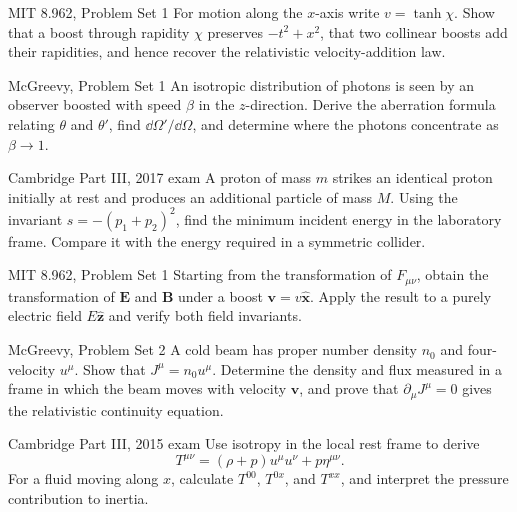 \begin{exercises}

\begin{exercise}{MIT 8.962, Problem Set 1}
For motion along the \(x\)-axis write \(v=\tanh\chi\).  Show that a boost through
rapidity \(\chi\) preserves \(-t^2+x^2\), that two collinear boosts add their
rapidities, and hence recover the relativistic velocity-addition law.
\end{exercise}

\begin{exercise}{McGreevy, Problem Set 1}
An isotropic distribution of photons is seen by an observer boosted with speed
\(\beta\) in the \(z\)-direction.  Derive the aberration formula relating
\(\theta\) and \(\theta'\), find \(\dd\Omega'/\dd\Omega\), and determine where
the photons concentrate as \(\beta\to1\).
\end{exercise}

\begin{exercise}{Cambridge Part III, 2017 exam}
A proton of mass \(m\) strikes an identical proton initially at rest and
produces an additional particle of mass \(M\).  Using the invariant
\(s=-(p_1+p_2)^2\), find the minimum incident energy in the laboratory frame.
Compare it with the energy required in a symmetric collider.
\end{exercise}

\begin{exercise}{MIT 8.962, Problem Set 1}
Starting from the transformation of \(F_{\mu\nu}\), obtain the transformation
of \(\bm E\) and \(\bm B\) under a boost \(\bm v=v\hat{\bm x}\).  Apply the
result to a purely electric field \(E\hat{\bm z}\) and verify both field
invariants.
\end{exercise}

\begin{exercise}{McGreevy, Problem Set 2}
A cold beam has proper number density \(n_0\) and four-velocity \(u^\mu\).
Show that \(J^\mu=n_0u^\mu\).  Determine the density and flux measured in a
frame in which the beam moves with velocity \(\bm v\), and prove that
\(\partial_\mu J^\mu=0\) gives the relativistic continuity equation.
\end{exercise}

\begin{exercise}{Cambridge Part III, 2015 exam}
Use isotropy in the local rest frame to derive
\[
T^{\mu\nu}=(\rho+p)u^\mu u^\nu+p\eta^{\mu\nu}.
\]
For a fluid moving along \(x\), calculate \(T^{00}\), \(T^{0x}\), and
\(T^{xx}\), and interpret the pressure contribution to inertia.
\end{exercise}


\end{exercises}
